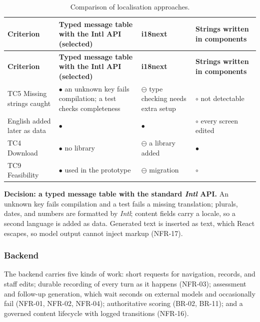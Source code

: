 {\small
\begin{longtable}{|>{\raggedright\arraybackslash}p{}|>{\raggedright\arraybackslash}p{}|>{\raggedright\arraybackslash}p{}|>{\raggedright\arraybackslash}p{}|}
\caption{Comparison of localisation approaches.} \\
\hline
\textbf{Criterion} & \textbf{Typed message table with the Intl API (selected)} & \textbf{i18next\cite{r178}} & \textbf{Strings written in components} \\ \hline
\endfirsthead
\hline
\textbf{Criterion} & \textbf{Typed message table with the Intl API (selected)} & \textbf{i18next\cite{r178}} & \textbf{Strings written in components} \\ \hline
\endhead
TC5 Missing strings caught & $\bullet$ an unknown key fails compilation; a test checks completeness & $\ominus$ type checking needs extra setup & $\circ$ not detectable \\ \hline
English added later as data & $\bullet$ & $\bullet$ & $\circ$ every screen edited \\ \hline
TC4 Download & $\bullet$ no library & $\ominus$ a library added & $\bullet$ \\ \hline
TC9 Feasibility & $\bullet$ used in the prototype & $\ominus$ migration & $\circ$ \\ \hline
\end{longtable}
}

\textbf{Decision: a typed message table with the standard \textit{Intl} API.} An unknown key fails compilation and a test fails a missing translation; plurals, dates, and numbers are formatted by \textit{Intl}\cite{r147}; content fields carry a locale, so a second language is added as data. Generated text is inserted as text, which React escapes, so model output cannot inject markup (NFR-17)\cite{r148}.

\subsubsection{Backend}

The backend carries five kinds of work: short requests for navigation, records, and staff edits; durable recording of every turn as it happens (NFR-03); assessment and follow-up generation, which wait seconds on external models and occasionally fail (NFR-01, NFR-02, NFR-04); authoritative scoring (BR-02, BR-11); and a governed content lifecycle with logged transitions (NFR-16).

